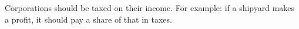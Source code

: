 Corporations should be taxed on their income.
For example:
if a shipyard makes a profit, it should pay a share of that in taxes.
